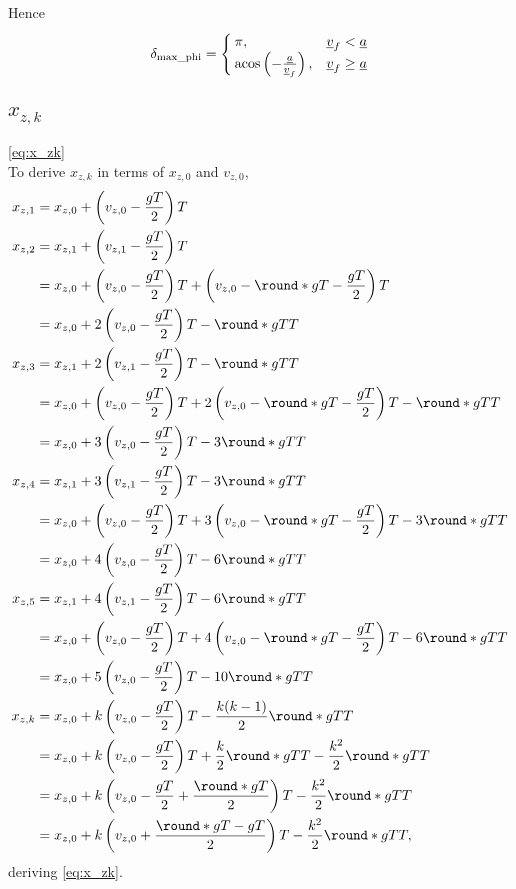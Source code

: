 Hence
\begin{align*}
\delta_{\maxphi} =
\begin{cases}
\pi, &\flat{v}_f < \flat{a}\\
\acos\left( -\frac{\flat{a}}{\flat{v}_f} \right), &\flat{v}_f \ge \flat{a}\\
\end{cases}
\end{align*}


\subsection{\texorpdfstring{$x_{z,k}$}{x\_z k}}
\label{app:derive_x_zk}
\eqref{eq:x_zk}\\
To derive $x_{z,k}$ in terms of $x_{z,0}$ and $v_{z,0}$,
\begin{align*}
x_{z,1} &= x_{z,0} + \left(v_{z,0} - \frac{gT}{2} \right) T\\
x_{z,2} &= x_{z,1} + \left(v_{z,1} - \frac{gT}{2} \right) T\\
&= x_{z,0} + \left(v_{z,0} - \frac{gT}{2} \right) T + \left(v_{z,0} - \round*{gT} - \frac{gT}{2} \right) T\\
&= x_{z,0} + 2\left(v_{z,0} - \frac{gT}{2} \right) T - \round*{gT} T\\
x_{z,3} &= x_{z,1} + 2\left(v_{z,1} - \frac{gT}{2} \right) T - \round*{gT} T\\
&= x_{z,0} + \left(v_{z,0} - \frac{gT}{2} \right) T + 2\left(v_{z,0} - \round*{gT} - \frac{gT}{2} \right) T - \round*{gT} T\\
&= x_{z,0} + 3\left(v_{z,0} - \frac{gT}{2} \right) T - 3\round*{gT} T\\
x_{z,4} &= x_{z,1} + 3\left(v_{z,1} - \frac{gT}{2} \right) T - 3\round*{gT} T\\
&= x_{z,0} + \left(v_{z,0} - \frac{gT}{2} \right) T + 3\left(v_{z,0} - \round*{gT} - \frac{gT}{2} \right) T - 3\round*{gT} T\\
&= x_{z,0} + 4\left(v_{z,0} - \frac{gT}{2} \right) T - 6\round*{gT} T\\
x_{z,5} &= x_{z,1} + 4\left(v_{z,1} - \frac{gT}{2} \right) T - 6\round*{gT} T\\
&= x_{z,0} + \left(v_{z,0} - \frac{gT}{2} \right) T + 4\left(v_{z,0} - \round*{gT} - \frac{gT}{2} \right) T - 6\round*{gT} T\\
&= x_{z,0} + 5\left(v_{z,0} - \frac{gT}{2} \right) T - 10\round*{gT} T\\
x_{z,k} &= x_{z,0} + k\left(v_{z,0} - \frac{gT}{2} \right) T - \frac{k(k - 1)}{2} \round*{gT} T\\
&= x_{z,0} + k\left(v_{z,0} - \frac{gT}{2} \right) T + \frac{k}{2} \round*{gT} T - \frac{k^2}{2} \round*{gT} T\\
&= x_{z,0} + k\left(v_{z,0} - \frac{gT}{2} + \frac{\round*{gT}}{2} \right) T - \frac{k^2}{2} \round*{gT} T\\
&= x_{z,0} + k\left(v_{z,0} + \frac{\round*{gT} - gT}{2} \right) T - \frac{k^2}{2} \round*{gT} T,
\end{align*}
deriving \eqref{eq:x_zk}.
